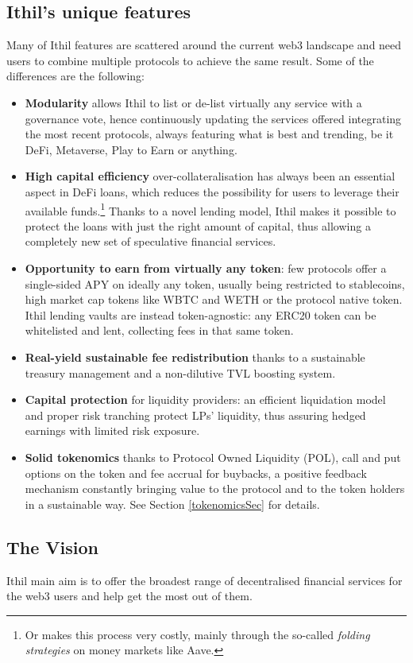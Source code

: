 \documentclass[a4paper,10 pt]{article}
\theoremstyle{definition}
\begin{document}
\subsection{Ithil's unique features}
Many of Ithil features are scattered around the current web3 landscape and need users to combine multiple protocols to achieve the same result. Some of the differences are the following:
\begin{itemize}
\item {\bf Modularity} allows Ithil to list or de-list virtually any service with a governance vote, hence continuously updating the services offered integrating the most recent protocols, always featuring what is best and trending, be it DeFi, Metaverse, Play to Earn or anything.
\item {\bf High capital efficiency} over-collateralisation has always been an essential aspect in DeFi loans, which reduces the possibility for users to leverage their available funds.\footnote{Or makes this process very costly, mainly through the so-called {\it folding strategies} on money markets like Aave.} Thanks to a novel lending model, Ithil makes it possible to protect the loans with just the right amount of capital, thus allowing a completely new set of speculative financial services.
\item {\bf Opportunity to earn from virtually any token}: few protocols offer a single-sided APY on ideally any token, usually being restricted to stablecoins, high market cap tokens like WBTC and WETH or the protocol native token. Ithil lending vaults are instead token-agnostic: any ERC20 token can be whitelisted and lent, collecting fees in that same token.
\item {\bf Real-yield sustainable fee redistribution} thanks to a sustainable treasury management and a non-dilutive TVL boosting system.
\item {\bf Capital protection} for liquidity providers: an efficient liquidation model and proper risk tranching protect LPs' liquidity, thus assuring hedged earnings with limited risk exposure.
\item {\bf Solid tokenomics} thanks to Protocol Owned Liquidity (POL), call and put options on the token and fee accrual for buybacks, a positive feedback mechanism constantly bringing value to the protocol and to the token holders in a sustainable way. See Section \ref{tokenomicsSec} for details. 
\end{itemize}

\subsection{The Vision}
Ithil main aim is to offer the broadest range of decentralised financial services for the web3 users and help get the most out of them.
\end{document}
